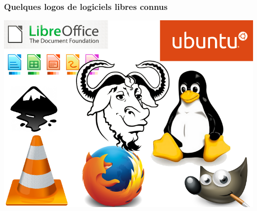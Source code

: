 \documentclass{beamer}
\begin{document}
\begin{frame}
\frametitle{Quelques logos de logiciels libres connus}
\includegraphics[scale=0.5] {./images/Le_logiciel_libre.png} 
\end{frame}
\end{document}

